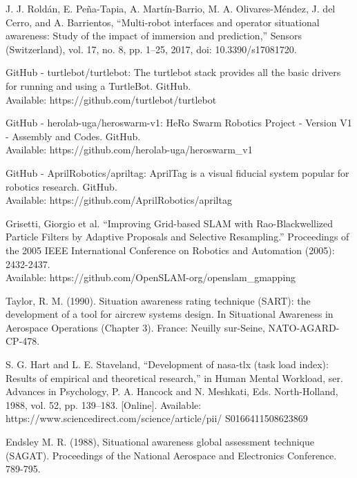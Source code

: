 \documentclass[conference]{IEEEtran}
\begin{document}
\begin{thebibliography}{00}
J. J. Roldán, E. Peña-Tapia, A. Martín-Barrio, M. A. Olivares-Méndez, J. del Cerro, and A. Barrientos, “Multi-robot interfaces and operator situational awareness: Study of the impact of immersion and prediction,” Sensors (Switzerland), vol. 17, no. 8, pp. 1–25, 2017, doi: 10.3390/s17081720.


GitHub - turtlebot/turtlebot: The turtlebot stack provides all the basic drivers for running and using a TurtleBot. GitHub. \\ Available: https://github.com/turtlebot/turtlebot

GitHub - herolab-uga/heroswarm-v1: HeRo Swarm Robotics Project - Version V1 - Assembly and Codes. GitHub. \\ Available:   https://github.com/herolab-uga/heroswarm\_v1


GitHub - AprilRobotics/apriltag: AprilTag is a visual fiducial system popular for robotics research. GitHub. \\ Available: https://github.com/AprilRobotics/apriltag

Grisetti, Giorgio et al. “Improving Grid-based SLAM with Rao-Blackwellized Particle Filters by Adaptive Proposals and Selective Resampling.” Proceedings of the 2005 IEEE International Conference on Robotics and Automation (2005): 2432-2437.\\ Available: https://github.com/OpenSLAM-org/openslam\_gmapping

Taylor, R. M. (1990). Situation awareness rating technique (SART): the development of a tool for aircrew systems design. In Situational Awareness in Aerospace Operations (Chapter 3). France: Neuilly sur-Seine, NATO-AGARD-CP-478.

S. G. Hart and L. E. Staveland, “Development of nasa-tlx (task load index): Results of empirical and theoretical research,” in Human Mental Workload, ser. Advances in Psychology, P. A. Hancock and N. Meshkati, Eds. North-Holland, 1988, vol. 52, pp. 139–183. [Online]. Available: https://www.sciencedirect.com/science/article/pii/ S0166411508623869



Endsley M. R. (1988), Situational awareness global assessment technique (SAGAT). Proceedings of the National Aerospace and Electronics Conference. 789-795.

\end{thebibliography}




\vspace{12pt}
\end{document}
